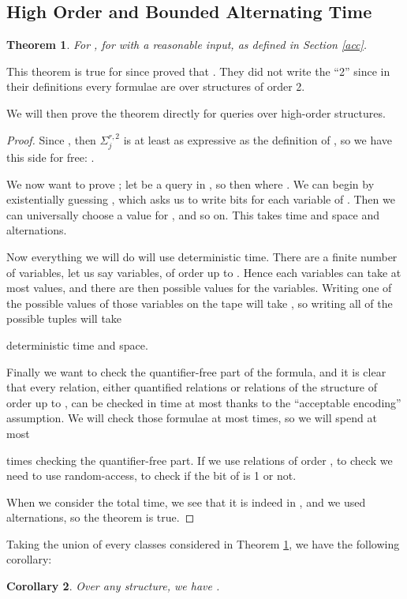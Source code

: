 \documentclass[a4paper,12pt]{article}
\newtheorem{theorem}{Theorem}[section]
\newtheorem{corollary}[theorem]{Corollary}
\theoremstyle{definition}
\newcommand{\hoc}[3]{\ensuremath{\Sigma^{#1,#3}_{#2}}}
\begin{document}
\subsection{High Order and Bounded Alternating Time}

\begin{theorem}\label{atimeorder} For , 
   for  with
  a reasonable input, as defined in Section \ref{acc}.
\end{theorem}

This theorem is true for  since
\cite{lauri,kolo} proved that
. They did
not write the ``2'' since in their definitions every formulae are over
structures of order 2.

We will then prove the theorem directly for queries over high-order
structures.
\begin{proof}
  Since  , then \hoc rj2 is at least as
  expressive as the definition of \cite{lauri}, so we have this side for
  free: .

  We now want to prove ; let  be a query in
  , so then  where . We
  can begin by existentially guessing , which asks us
  to write  bits for each
  variable of . Then we can universally choose a value
  for , and so on. This takes time and space
   and  alternations. 

    Now everything we will do will use
  deterministic time. There are a finite number of variables, let us
  say  variables, of order up to . Hence each variables can
  take at most  values, and there are then
   possible values for the 
  variables. Writing one of the possible values of those  variables
  on the tape will take , so writing
  all of the possible tuples will take
  
  deterministic time and space.

  Finally we want to check the quantifier-free part of the formula,
  and it is clear that every relation, either quantified relations or
  relations of the structure of order up to , can be checked in
  time at most  thanks to the
  ``acceptable encoding'' assumption. We will check those formulae at
  most  times, so we will spend at most
  
  times checking the quantifier-free part. If we use relations of
  order , to check  we need to use
  random-access, to check if the  bit of  is 1 or not.

  When we consider the total time, we see that it is indeed in
  , and we used  alternations, so
  the theorem is true.
\end{proof}
Taking the union of every classes considered in Theorem
\ref{atimeorder}, we have the following corollary:
\begin{corollary}
  Over any structure, we have .
\end{corollary}
\end{document}
